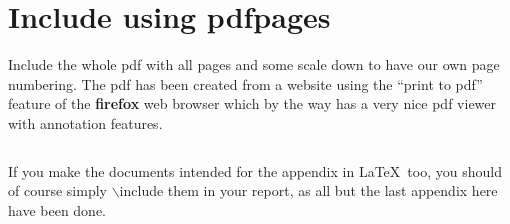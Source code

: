 \renewcommand\headrule{}
\chapter{Include using pdfpages}
Include the whole pdf with all pages and some scale down to have our
own page numbering.
The pdf has been created from a website using the ``print to pdf''
feature of the \textbf{firefox} web browser which by the way has a
very nice pdf viewer with annotation features.
\lstset{language=[LaTeX]TeX}
\begin{lstlisting}[caption={code to include next pages as pdf}]

\end{lstlisting}

If you make the documents intended for the appendix in \LaTeX\ too,
you should of course simply $\backslash$include them in your report,
as all but the last appendix here have been done.



